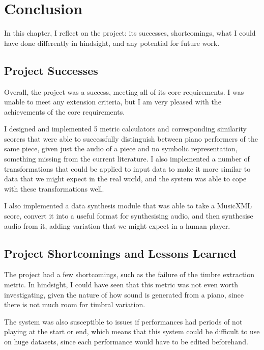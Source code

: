 \documentclass[oneside, class=book, 12pt, crop=false]{standalone}
\begin{document}
\ifstandalone
  \setcounter{chapter}{4}
  \chapter{Conclusion}
\fi
{}


In this chapter, I reflect on the project: its successes, shortcomings, what I could have done differently in hindsight, and any potential for future work.

\section{Project Successes}

Overall, the project was a success, meeting all of its core requirements. I was unable to meet any extension criteria, but I am very pleased with the achievements of the core requirements.

I designed and implemented 5 metric calculators and corresponding similarity scorers that were able to successfully distinguish between piano performers of the same piece, given just the audio of a piece and no symbolic representation, something missing from the current literature. I also implemented a number of transformations that could be applied to input data to make it more similar to data that we might expect in the real world, and the system was able to cope with these transformations well.

I also implemented a data synthesis module that was able to take a MusicXML score, convert it into a useful format for synthesising audio, and then synthesise audio from it, adding variation that we might expect in a human player. 

\section{Project Shortcomings and Lessons Learned}

The project had a few shortcomings, such as the failure of the timbre extraction metric. In hindsight, I could have seen that this metric was not even worth investigating, given the nature of how sound is generated from a piano, since there is not much room for timbral variation.

The system was also susceptible to issues if performances had periods of not playing at the start or end, which means that this system could be difficult to use on huge datasets, since each performance would have to be edited beforehand.
\end{document}
